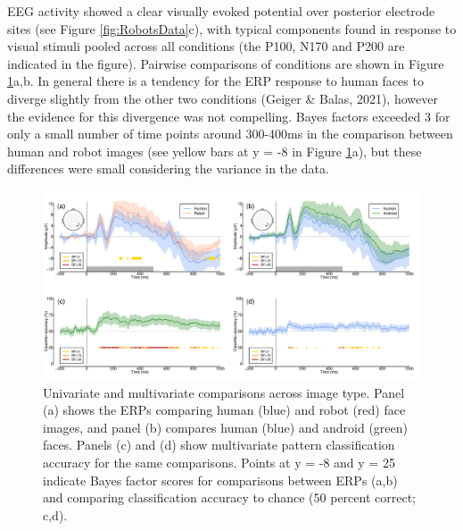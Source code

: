 \documentclass[
]{article}
\begin{document}
EEG activity showed a clear visually evoked potential over posterior electrode sites (see Figure \ref{fig:RobotsData}c), with typical components found in response to visual stimuli pooled across all conditions (the P100, N170 and P200 are indicated in the figure). Pairwise comparisons of conditions are shown in Figure \ref{fig:RobotsMVPA}a,b. In general there is a tendency for the ERP response to human faces to diverge slightly from the other two conditions (Geiger \& Balas, 2021), however the evidence for this divergence was not compelling. Bayes factors exceeded 3 for only a small number of time points around 300-400ms in the comparison between human and robot images (see yellow bars at y = -8 in Figure \ref{fig:RobotsMVPA}a), but these differences were small considering the variance in the data.

\begin{figure}

{\centering \includegraphics{Figures/RobotsMVPA} 

}

\caption{Univariate and multivariate comparisons across image type. Panel (a) shows the ERPs comparing human (blue) and robot (red) face images, and panel (b) compares human (blue) and android (green) faces. Panels (c) and (d) show multivariate pattern classification accuracy for the same comparisons. Points at y = -8 and y = 25 indicate Bayes factor scores for comparisons between ERPs (a,b) and comparing classification accuracy to chance (50 percent correct; c,d).}\label{fig:RobotsMVPA}
\end{figure}
\end{document}
